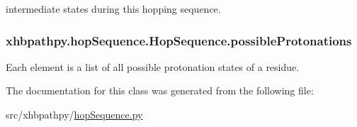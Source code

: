 intermediate states during this hopping sequence. 

\hypertarget{classxhbpathpy_1_1hop_sequence_1_1_hop_sequence_ae1ae68a0b84510f0eda0b61b7c533538}{
\subsubsection[{possible\-Protonations}]{\setlength{\rightskip}{0pt plus 5cm}xhbpathpy.\-hop\-Sequence.\-Hop\-Sequence.\-possible\-Protonations}}\label{classxhbpathpy_1_1hop_sequence_1_1_hop_sequence_ae1ae68a0b84510f0eda0b61b7c533538}


Each element is a list of all possible protonation states of a residue. 



The documentation for this class was generated from the following file\-:\begin{DoxyCompactItemize}
\item 
src/xhbpathpy/\hyperlink{hop_sequence_8py}{hop\-Sequence.\-py}\end{DoxyCompactItemize}
